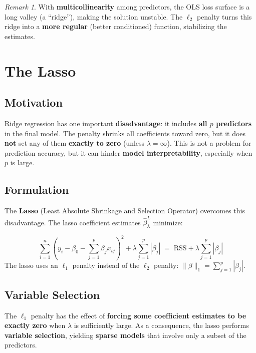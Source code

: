 \documentclass[11pt,a4paper]{article}
\theoremstyle{definition}
\theoremstyle{plain}
\theoremstyle{remark}
\newtheorem*{remark}{Remark}
\begin{document}
\begin{remark}
With \textbf{multicollinearity} among predictors, the OLS loss surface is a long valley (a ``ridge''), making the solution unstable. The $\ell_2$ penalty turns this ridge into a \textbf{more regular} (better conditioned) function, stabilizing the estimates.
\end{remark}

\section{The Lasso}

\subsection{Motivation}

Ridge regression has one important \textbf{disadvantage}: it includes \textbf{all $p$ predictors} in the final model. The penalty shrinks all coefficients toward zero, but it does \textbf{not} set any of them \textbf{exactly to zero} (unless $\lambda = \infty$). This is not a problem for prediction accuracy, but it can hinder \textbf{model interpretability}, especially when $p$ is large.

\subsection{Formulation}

The \textbf{Lasso} (Least Absolute Shrinkage and Selection Operator) overcomes this disadvantage. The lasso coefficient estimates $\hat{\beta}^L_\lambda$ minimize:

\begin{tcolorbox}[colback=blue!5!white,colframe=blue!75!black,title=\textbf{Lasso Objective}]
\[
    \sum_{i=1}^{n} \left(y_i - \beta_0 - \sum_{j=1}^{p} \beta_j x_{ij}\right)^{\!2} + \lambda \sum_{j=1}^{p} |\beta_j|
    \;=\; \mathrm{RSS} + \lambda \sum_{j=1}^{p} |\beta_j|
\]
The lasso uses an $\ell_1$ penalty instead of the $\ell_2$ penalty: $\|\beta\|_1 = \sum_{j=1}^{p} |\beta_j|$.
\end{tcolorbox}

\subsection{Variable Selection}

The $\ell_1$ penalty has the effect of \textbf{forcing some coefficient estimates to be exactly zero} when $\lambda$ is sufficiently large. As a consequence, the lasso performs \textbf{variable selection}, yielding \textbf{sparse models} that involve only a subset of the predictors.
\end{document}
